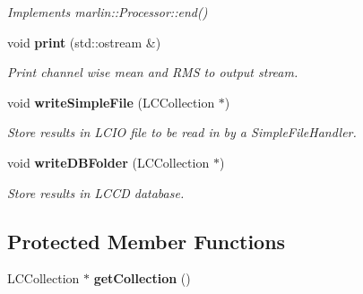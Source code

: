 \begin{DoxyCompactItemize}
\begin{DoxyCompactList}\small\item\em Implements marlin\-::\-Processor\-::end() \end{DoxyCompactList}\item 
void {\bf print} (std\-::ostream \&)\label{classCALICE_1_1ExtractConfigurationAverageProcessor_a6c7e3795c5dce5f4430a3fe53a577ff4}

\begin{DoxyCompactList}\small\item\em Print channel wise mean and R\-M\-S to output stream. \end{DoxyCompactList}\item 
void {\bf write\-Simple\-File} (L\-C\-Collection $\ast$)\label{classCALICE_1_1ExtractConfigurationAverageProcessor_a6a64edef52110005a069deafdadabb30}

\begin{DoxyCompactList}\small\item\em Store results in L\-C\-I\-O file to be read in by a Simple\-File\-Handler. \end{DoxyCompactList}\item 
void {\bf write\-D\-B\-Folder} (L\-C\-Collection $\ast$)\label{classCALICE_1_1ExtractConfigurationAverageProcessor_ad81f6e7290071ff7ad46f62a268b05a9}

\begin{DoxyCompactList}\small\item\em Store results in L\-C\-C\-D database. \end{DoxyCompactList}\end{DoxyCompactItemize}
\subsection*{Protected Member Functions}
\begin{DoxyCompactItemize}
\item 
L\-C\-Collection $\ast$ {\bfseries get\-Collection} ()\label{classCALICE_1_1ExtractConfigurationAverageProcessor_a723f985ee753e55a96b5a1d484e91769}

\end{DoxyCompactItemize}
